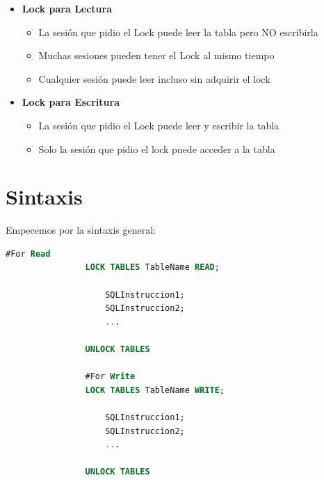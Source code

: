 \documentclass[12pt, fleqn]{report}                             %
\theoremstyle{break}                                            %
\begin{document}
                \begin{itemize}
                    \item 
                        \textbf{Lock para Lectura}
                        \begin{itemize}
                            \item La sesión que pidio el Lock puede leer la tabla pero NO escribirla
                            \item Muchas sesiones pueden tener el Lock al mismo tiempo
                            \item Cualquier sesión puede leer incluso sin adquirir el lock
                        \end{itemize}

                    \item 
                        \textbf{Lock para Escritura}
                        \begin{itemize}
                            \item La sesión que pidio el Lock puede leer y escribir la tabla
                            \item Solo la sesión que pidio el lock puede acceder a la tabla
                        \end{itemize}
                \end{itemize}


        \clearpage
        \section{Sintaxis}

            Empecemos por la sintaxis general:

            \begin{lstlisting}[language=SQL, gobble=16]
                #For Read
                LOCK TABLES TableName READ;

                    SQLInstruccion1;
                    SQLInstruccion2;
                    ...

                UNLOCK TABLES

                #For Write
                LOCK TABLES TableName WRITE;

                    SQLInstruccion1;
                    SQLInstruccion2;
                    ...

                UNLOCK TABLES
            \end{lstlisting}
\end{document}
